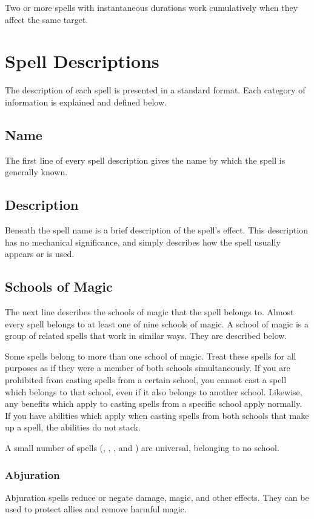              Two or more spells with instantaneous durations work cumulatively when they affect the same target.

\section{Spell Descriptions}
    The description of each spell is presented in a standard format. Each category of information is explained and defined below.

    \subsection{Name}
        The first line of every spell description gives the name by which the spell is generally known.

    \subsection{Description}
        Beneath the spell name is a brief description of the spell's effect. This description has no mechanical significance, and simply describes how the spell usually appears or is used.

    \subsection{Schools of Magic}\label{Schools of Magic}
        The next line describes the schools of magic that the spell belongs to. Almost every spell belongs to at least one of nine schools of magic. A school of magic is a group of related spells that work in similar ways. They are described below.

        Some spells belong to more than one school of magic. Treat these spells for all purposes as if they were a member of both schools simultaneously. If you are prohibited from casting spells from a certain school, you cannot cast a spell which belongs to that school, even if it also belongs to another school. Likewise, any benefits which apply to casting spells from a specific school apply normally. If you have abilities which apply when casting spells from both schools that make up a spell, the abilities do not stack.

        A small number of spells (, , , and ) are universal, belonging to no school.

        \subsubsection{Abjuration}
            Abjuration spells reduce or negate damage, magic, and other effects. They can be used to protect allies and remove harmful magic.

